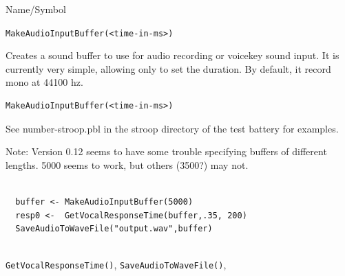 \begin{desc}{Name/Symbol}
\item[Name/Symbol]	\verb+MakeAudioInputBuffer(<time-in-ms>)+

\item[Description] Creates a sound buffer to use for audio recording or voicekey sound input.  It is currently very simple, allowing only to set the duration.  By default, it record mono at 44100 hz.

\item[Usage]
\begin{verbatim}
MakeAudioInputBuffer(<time-in-ms>)
\end{verbatim}

See number-stroop.pbl in the stroop directory of the test battery for examples.

Note: Version 0.12 seems to have some trouble specifying buffers of different lengths.  5000 seems to work, but others (3500?) may not.
\item[Example]	
\begin{verbatim}

  buffer <- MakeAudioInputBuffer(5000)
  resp0 <-  GetVocalResponseTime(buffer,.35, 200)
  SaveAudioToWaveFile("output.wav",buffer)
  
\end{verbatim}
\item[See Also] 	\verb+GetVocalResponseTime()+, \verb+SaveAudioToWaveFile()+,
\end{desc}


